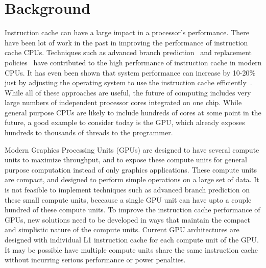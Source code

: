 \section{Background}

Instruction cache can have a large impact in a processor's
performance. 
There have been lot of work in the past in improving the performance
of instruction cache  CPUs. 
Techniques such as advanced branch prediction~\cite{yeh93} and
replacement policies~\cite{smith85} have contributed to the high
performance of instruction cache in modern CPUs. 
It has even been shown that system performance can increase by 10-20\%
just by adjusting the operating system to use the instruction cache
efficiently~\cite{torrellas98}.
While all of these approaches are useful, the future of computing
includes very large numbers of independent processor cores integrated
on one chip.
While general purpose CPUs are likely to include hundreds of cores at
some point in the future, a good example to consider today is the GPU,
which already exposes hundreds to thousands of threads to the
programmer. 

Modern Graphics Processing Units (GPUs) are designed to have several
compute units to maximize throughput, and to expose these compute
units for general purpose computation instead of only graphics
applications.
These compute units are compact, and designed to perform simple
operations on a large set of data. 
It is not feasible to implement techniques such as advanced branch
prediction on these small compute units, beccause a single GPU unit
can have upto a couple hundred of these compute units. 
To improve the instruction cache performance of GPUs, new solutions
need to be developed in ways that maintain the compact and simplistic
nature of the compute units. 
Current GPU architectures are designed with individual L1 instruction
cache for each compute unit of the GPU\cite{keckler11}. 
It may be possible have multiple compute units share the same
instruction cache without incurring serious performance or power
penalties.
